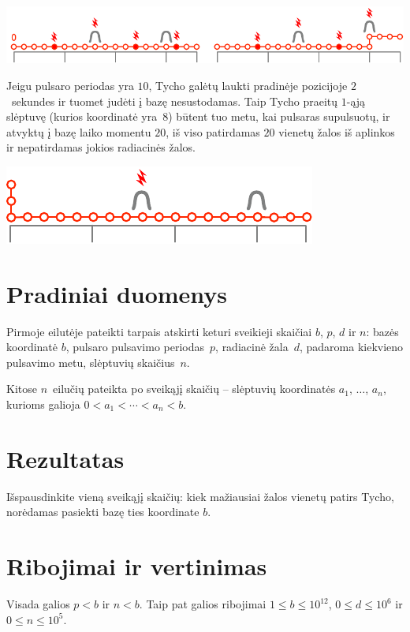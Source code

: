 \includegraphics[width=.8\textwidth]{img/sample1_2.pdf}

Jeigu pulsaro periodas yra $10$, Tycho galėtų laukti pradinėje pozicijoje $2$~sekundes ir tuomet judėti į bazę nesustodamas.
Taip Tycho praeitų $1$-ąją slėptuvę (kurios koordinatė yra~$8$) būtent tuo metu, kai pulsaras supulsuotų, ir atvyktų į bazę laiko momentu $20$, iš viso patirdamas $20$ vienetų žalos iš aplinkos ir nepatirdamas jokios radiacinės žalos.	

\includegraphics[width=.4\textwidth]{img/sample3.pdf}

\section*{Pradiniai duomenys}

Pirmoje eilutėje pateikti tarpais atskirti keturi sveikieji skaičiai $b$, $p$, $d$ ir $n$:
bazės koordinatė $b$,
pulsaro pulsavimo periodas~$p$,
radiacinė žala~$d$, padaroma kiekvieno pulsavimo metu,
slėptuvių skaičius~$n$.

Kitose $n$~eilučių pateikta po sveikąjį skaičių -- slėptuvių koordinatės $a_1$, $\ldots$, $a_n$, kurioms galioja
$0<a_1<\cdots <a_n< b$. %

\section*{Rezultatas}

Išspausdinkite vieną sveikąjį skaičių: kiek mažiausiai žalos vienetų patirs Tycho, norėdamas pasiekti bazę ties koordinate $b$.

\section*{Ribojimai ir vertinimas}

Visada galios
$p < b$ %
ir
$n < b$. %
Taip pat galios ribojimai
$1\leq b\leq 10^{12}$, %
$0\leq d \leq 10^6$ %
ir
$0\leq n \leq 10^5$. %

